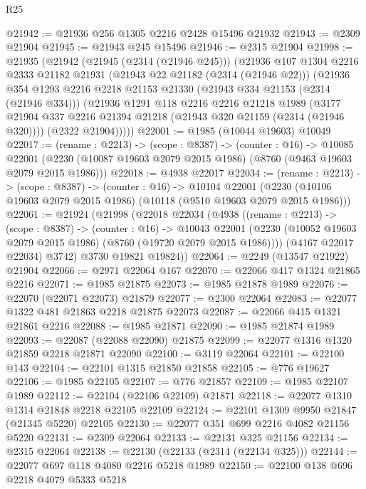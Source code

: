 \begin{lexlean}{R25}
\begin{coremodule}
@21942 := @21936 @256 @1305 @2216 @2428 @15496 @21932
@21943 := @2309 @21904
@21945 := @21943 @245 @15496
@21946 := @2315 @21904
@21998 := @21935
    (@21942
      (@21945 (@2314 (@21946 @245)))
      (@21936
        @107
        @1304
        @2216
        @2333
        @21182
        @21931
        (@21943 @22 @21182 (@2314 (@21946 @22)))
        (@21936
          @354
          @1293
          @2216
          @2218
          @21153
          @21330
          (@21943 @334 @21153 (@2314 (@21946 @334)))
          (@21936
            @1291
            @118
            @2216
            @2216
            @21218
            @1989
            (@3177 @21904 @337 @2216 @21394 @21218 (@21943 @320 @21159 (@2314 (@21946 @320))))
            (@2322 @21904)))))
@22001 := @1985 (@10044 @19603) @10049
@22017 := (rename : @2213) ->
  (scope : @8387) ->
  (counter : @16) ->
  @10085 @22001 (@2230 (@10087 @19603 @2079 @2015 @1986) (@8760 (@9463 @19603 @2079 @2015 @1986)))
@22018 := @4938 @22017
@22034 := (rename : @2213) ->
  (scope : @8387) ->
  (counter : @16) ->
  @10104 @22001 (@2230 (@10106 @19603 @2079 @2015 @1986) (@10118 (@9510 @19603 @2079 @2015 @1986)))
@22061 := @21924
    (@21998
      (@22018
        @22034
        (@4938
          ((rename : @2213) ->
          (scope : @8387) ->
          (counter : @16) ->
          @10043
            @22001
            (@2230 (@10052 @19603 @2079 @2015 @1986) (@8760 (@19720 @2079 @2015 @1986))))
          (@4167 @22017 @22034)
          @3742)
        @3730
        @19821
        @19824))
@22064 := @2249 (@13547 @21922) @21904
@22066 := @2971 @22064 @167
@22070 := @22066 @417 @1324 @21865 @2216
@22071 := @1985 @21875
@22073 := @1985 @21878 @1989
@22076 := @22070 (@22071 @22073) @21879
@22077 := @2300 @22064
@22083 := @22077 @1322 @481 @21863 @2218 @21875 @22073
@22087 := @22066 @415 @1321 @21861 @2216
@22088 := @1985 @21871
@22090 := @1985 @21874 @1989
@22093 := @22087 (@22088 @22090) @21875
@22099 := @22077 @1316 @1320 @21859 @2218 @21871 @22090
@22100 := @3119 @22064
@22101 := @22100 @143
@22104 := @22101 @1315 @21850 @21858
@22105 := @776 @19627
@22106 := @1985 @22105
@22107 := @776 @21857
@22109 := @1985 @22107 @1989
@22112 := @22104 (@22106 @22109) @21871
@22118 := @22077 @1310 @1314 @21848 @2218 @22105 @22109
@22124 := @22101 @1309 @9950 @21847 (@21345 @5220) @22105
@22130 := @22077 @351 @699 @2216 @4082 @21156 @5220
@22131 := @2309 @22064
@22133 := @22131 @325 @21156
@22134 := @2315 @22064
@22138 := @22130 (@22133 (@2314 (@22134 @325)))
@22144 := @22077 @697 @118 @4080 @2216 @5218 @1989
@22150 := @22100 @138 @696 @2218 @4079 @5333 @5218

\end{coremodule}
\end{lexlean}
